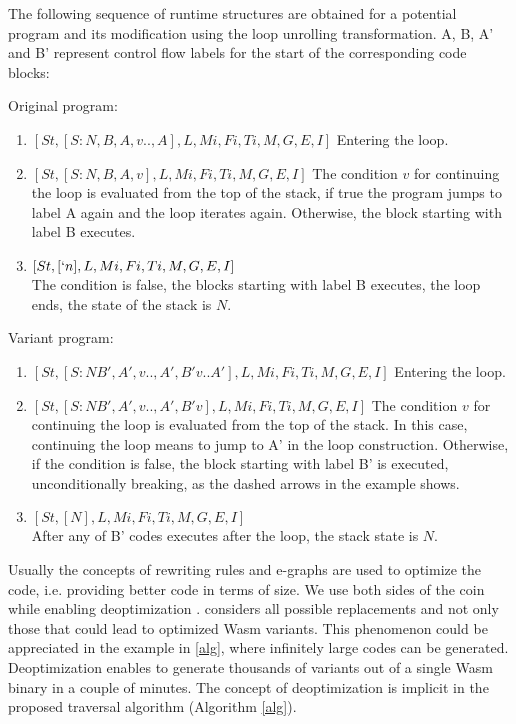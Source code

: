 The following sequence of runtime structures are obtained for a potential program and its modification using the loop unrolling transformation. A, B, A' and B' represent control flow labels for the start of the corresponding code blocks:


Original program:
\begin{enumerate}
    \item $[St, [S: N,B,A, v.., A], L, Mi, Fi, Ti, M, G, E, I]$ Entering the loop.
    \item $[St, [S: N,B,A, v], L, Mi, Fi, Ti, M, G, E, I]$ The condition $v$ for continuing the loop is evaluated from the top of the stack, if true the program jumps to label A again and the loop iterates again. Otherwise, the block starting with label B executes.
    \item $[St, [`n], L, Mi, Fi, Ti, M, G, E, I]$\\
    The condition is false, the blocks starting with label B executes, the loop ends, the state of the stack is $N$.
\end{enumerate}

Variant program:

\begin{enumerate}
    \item $[St, [S: N B',A', v.., A', B'v..A'], L, Mi, Fi, Ti, M, G, E, I]$ Entering the loop.
    \item $[St, [S: N B',A', v.., A', B'v], L, Mi, Fi, Ti, M, G, E, I]$ The condition $v$ for continuing the loop is evaluated from the top of the stack. In this case, continuing the loop means to jump to A' in the loop construction. Otherwise, if the condition is false, the block starting with label B' is executed, unconditionally breaking, as the dashed arrows in the example shows.
    \item $[St, [N], L, Mi, Fi, Ti, M, G, E, I]$\\
    After any of B' codes executes after the loop, the stack state is $N$.
\end{enumerate}



Usually the concepts of rewriting rules and e-graphs are used to optimize the code, i.e. providing better code in terms of size.
We use both sides of the coin while enabling deoptimization \cite{deoptimization}. 
\tool considers all possible replacements and not only those that could lead to optimized Wasm variants.
This phenomenon could be appreciated in the example in \autoref{alg}, where infinitely large codes can be generated.
Deoptimization enables \tool to generate thousands of variants out of a single Wasm binary in a couple of minutes.
The concept of deoptimization is implicit in the proposed traversal algorithm (Algorithm \ref{alg}).


